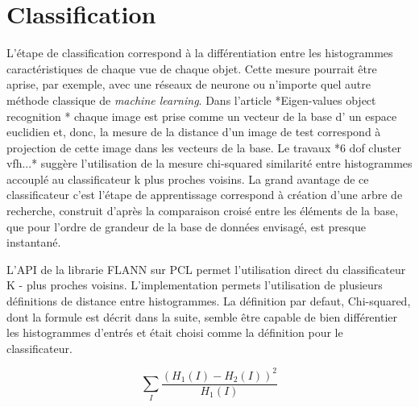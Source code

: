 \section {Classification} L'étape de classification correspond à la différentiation entre les
histogrammes caractéristiques de chaque vue de chaque objet. Cette
mesure pourrait être aprise, par exemple, avec une réseaux de neurone
ou n'importe quel autre méthode classique de \textit{machine learning}.
{\color{green} Dans l'article *Eigen-values object recognition * chaque
image est prise comme un vecteur de la base d' un espace euclidien et,
donc, la mesure de la distance d'un image de test correspond à
projection de cette image dans les vecteurs de la base}. Le travaux *6
dof cluster vfh...* suggère l'utilisation de la mesure chi-squared
similarité entre histogrammes accouplé au classificateur k plus
proches voisins. La grand avantage de ce classificateur c'est l'étape
de apprentissage correspond à création d'une arbre de recherche,
construit d'après la comparaison croisé entre les éléments de la base,
que pour l'ordre de grandeur de la base de données envisagé, est
presque instantané.

L'API de la librarie FLANN sur PCL permet l'utilisation direct du classificateur
K - plus proches voisins. L'implementation permets l'utilisation de plusieurs
définitions de distance entre histogrammes. La définition par defaut, Chi-squared,
dont la formule est décrit dans la suite, semble être capable de bien différentier
 les histogrammes d'entrés et était choisi comme la définition pour le classificateur.
 
 $$\sum _I \frac{\left(H_1(I)-H_2(I)\right)^2}{H_1(I)} $$




